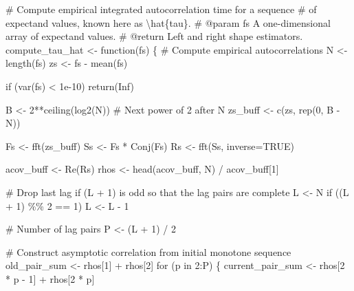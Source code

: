 \documentclass[
  letterpaper,
  DIV=11,
  numbers=noendperiod]{scrartcl}
\newenvironment{Shaded}{\begin{snugshade}}{\end{snugshade}}
\newcommand{\CommentTok}[1]{\textcolor[rgb]{0.37,0.37,0.37}{#1}}
\newcommand{\ControlFlowTok}[1]{\textcolor[rgb]{0.00,0.23,0.31}{#1}}
\newcommand{\DecValTok}[1]{\textcolor[rgb]{0.68,0.00,0.00}{#1}}
\newcommand{\FloatTok}[1]{\textcolor[rgb]{0.68,0.00,0.00}{#1}}
\newcommand{\KeywordTok}[1]{\textcolor[rgb]{0.00,0.23,0.31}{#1}}
\newcommand{\NormalTok}[1]{\textcolor[rgb]{0.00,0.23,0.31}{#1}}
\newcommand{\OperatorTok}[1]{\textcolor[rgb]{0.37,0.37,0.37}{#1}}
\begin{document}
\begin{Shaded}
\begin{Highlighting}[]
\CommentTok{\# Compute empirical integrated autocorrelation time for a sequence}
\CommentTok{\# of expectand values, known here as \textbackslash{}hat\{tau\}.}
\CommentTok{\# @param fs A one{-}dimensional array of expectand values.}
\CommentTok{\# @return Left and right shape estimators.}
\NormalTok{compute\_tau\_hat }\OperatorTok{\textless{}{-}}\NormalTok{ function(fs) \{}
  \CommentTok{\# Compute empirical autocorrelations}
\NormalTok{  N }\OperatorTok{\textless{}{-}}\NormalTok{ length(fs)}
\NormalTok{  zs }\OperatorTok{\textless{}{-}}\NormalTok{ fs }\OperatorTok{{-}}\NormalTok{ mean(fs)}
  
  \ControlFlowTok{if}\NormalTok{ (var(fs) }\OperatorTok{\textless{}} \FloatTok{1e{-}10}\NormalTok{)}
    \ControlFlowTok{return}\NormalTok{(Inf)}

\NormalTok{  B }\OperatorTok{\textless{}{-}} \DecValTok{2}\OperatorTok{**}\NormalTok{ceiling(log2(N)) }\CommentTok{\# Next power of 2 after N}
\NormalTok{  zs\_buff }\OperatorTok{\textless{}{-}}\NormalTok{ c(zs, rep(}\DecValTok{0}\NormalTok{, B }\OperatorTok{{-}}\NormalTok{ N))}

\NormalTok{  Fs }\OperatorTok{\textless{}{-}}\NormalTok{ fft(zs\_buff)}
\NormalTok{  Ss }\OperatorTok{\textless{}{-}}\NormalTok{ Fs }\OperatorTok{*}\NormalTok{ Conj(Fs)}
\NormalTok{  Rs }\OperatorTok{\textless{}{-}}\NormalTok{ fft(Ss, inverse}\OperatorTok{=}\NormalTok{TRUE)}

\NormalTok{  acov\_buff }\OperatorTok{\textless{}{-}}\NormalTok{ Re(Rs)}
\NormalTok{  rhos }\OperatorTok{\textless{}{-}}\NormalTok{ head(acov\_buff, N) }\OperatorTok{/}\NormalTok{ acov\_buff[}\DecValTok{1}\NormalTok{]}

  \CommentTok{\# Drop last lag if (L + 1) is odd so that the lag pairs are complete}
\NormalTok{  L }\OperatorTok{\textless{}{-}}\NormalTok{ N}
  \ControlFlowTok{if}\NormalTok{ ((L }\OperatorTok{+} \DecValTok{1}\NormalTok{) }\OperatorTok{\%\%} \DecValTok{2} \OperatorTok{==} \DecValTok{1}\NormalTok{)}
\NormalTok{    L }\OperatorTok{\textless{}{-}}\NormalTok{ L }\OperatorTok{{-}} \DecValTok{1}

  \CommentTok{\# Number of lag pairs}
\NormalTok{  P }\OperatorTok{\textless{}{-}}\NormalTok{ (L }\OperatorTok{+} \DecValTok{1}\NormalTok{) }\OperatorTok{/} \DecValTok{2}

  \CommentTok{\# Construct asymptotic correlation from initial monotone sequence}
\NormalTok{  old\_pair\_sum }\OperatorTok{\textless{}{-}}\NormalTok{ rhos[}\DecValTok{1}\NormalTok{] }\OperatorTok{+}\NormalTok{ rhos[}\DecValTok{2}\NormalTok{]}
  \ControlFlowTok{for}\NormalTok{ (p }\KeywordTok{in} \DecValTok{2}\NormalTok{:P) \{}
\NormalTok{    current\_pair\_sum }\OperatorTok{\textless{}{-}}\NormalTok{ rhos[}\DecValTok{2} \OperatorTok{*}\NormalTok{ p }\OperatorTok{{-}} \DecValTok{1}\NormalTok{] }\OperatorTok{+}\NormalTok{ rhos[}\DecValTok{2} \OperatorTok{*}\NormalTok{ p]}
  

\end{Highlighting}
\end{Shaded}
\end{document}
